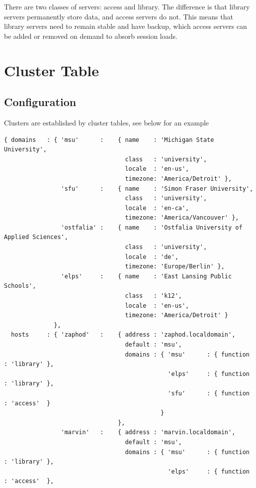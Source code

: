 There are two classes of servers: access and library. The difference is that library servers permanently store data, and access servers do not. This means that library servers need to remain stable and have backup, which access servers can be added or removed on demand to absorb session loads.
\section{Cluster Table}
\subsection{Configuration}\label{clustertable}
Clusters are established by cluster tables, see below for an example
\begin{verbatim}
{ domains   : { 'msu'      :    { name    : 'Michigan State University',
                                  class   : 'university',
                                  locale  : 'en-us', 
                                  timezone: 'America/Detroit' },
                'sfu'      :    { name    : 'Simon Fraser University',
                                  class   : 'university',
                                  locale  : 'en-ca',
                                  timezone: 'America/Vancouver' },
                'ostfalia' :    { name    : 'Ostfalia University of Applied Sciences',
                                  class   : 'university',
                                  locale  : 'de',
                                  timezone: 'Europe/Berlin' },
                'elps'     :    { name    : 'East Lansing Public Schools',
                                  class   : 'k12',
                                  locale  : 'en-us',
                                  timezone: 'America/Detroit' }
              },
  hosts     : { 'zaphod'   :    { address : 'zaphod.localdomain',
                                  default : 'msu',
                                  domains : { 'msu'      : { function : 'library' },
                                              'elps'     : { function : 'library' },
                                              'sfu'      : { function : 'access'  }
                                            }
                                },
                'marvin'   :    { address : 'marvin.localdomain',
                                  default : 'msu',
                                  domains : { 'msu'      : { function : 'library' },
                                              'elps'     : { function : 'access'  },

\end{verbatim}
